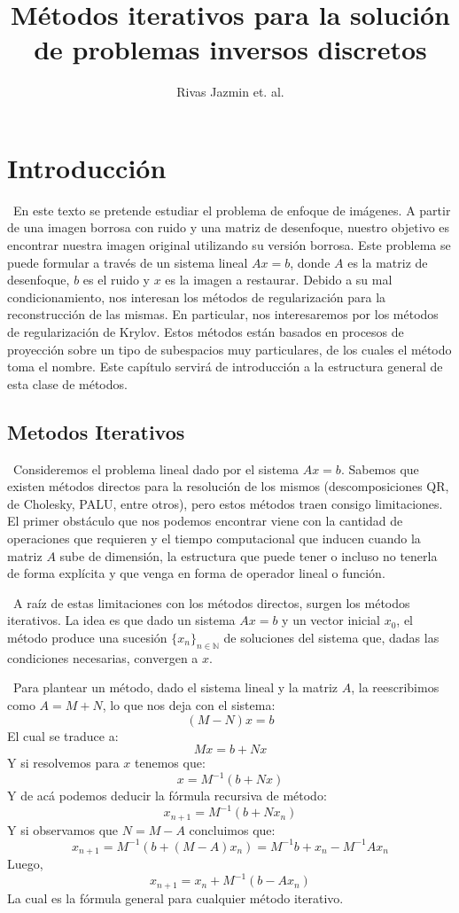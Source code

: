 \documentclass[12pt, oneside]{book}
\title{Métodos iterativos para la solución de problemas inversos discretos}
\author{Rivas Jazmin et. al.}
\date{}
\begin{document}
	\maketitle
	\tableofcontents
	
	
	\chapter{Introducción}
	\ En este texto se pretende estudiar el problema de enfoque de imágenes. A partir de una imagen borrosa con ruido y una matriz de desenfoque, nuestro objetivo es encontrar nuestra imagen original utilizando su versión borrosa. Este problema se puede formular a través de un sistema lineal $Ax = b$, donde $A$ es la matriz de desenfoque, $b$ es el ruido y $x$ es la imagen a restaurar. Debido a su mal condicionamiento, nos interesan los métodos de regularización para la reconstrucción de las mismas. En particular, nos interesaremos por los métodos de regularización de Krylov. Estos métodos están basados en procesos de proyección sobre un tipo de subespacios muy particulares, de los cuales el método toma el nombre. Este capítulo servirá de introducción a la estructura general de esta clase de métodos.
	
	
\section{Metodos Iterativos}
\ Consideremos el problema lineal dado por el sistema $Ax = b$. Sabemos que existen métodos directos para la resolución de los mismos (descomposiciones QR, de Cholesky, PALU, entre otros), pero estos métodos traen consigo limitaciones. El primer obstáculo que nos podemos encontrar viene con la cantidad de operaciones que requieren y el tiempo computacional que inducen cuando la matriz $A$ sube de dimensión, la estructura que puede tener o incluso no tenerla de forma explícita y que venga en forma de operador lineal o función.

\ A raíz de estas limitaciones con los métodos directos, surgen los métodos iterativos. La idea es que dado un sistema $Ax = b$ y un vector inicial $x_0$, el método produce una sucesión $\{x_n\}_{n \in \mathbb{N}}$ de soluciones del sistema que, dadas las condiciones necesarias, convergen a $x$.

\ Para plantear un método, dado el sistema lineal y la matriz $A$, la reescribimos como $A=M+N$, lo que nos deja con el sistema: $$(M-N)x=b$$ El cual se traduce a: $$Mx=b+Nx$$ Y si resolvemos para $x$ tenemos que: $$x=M^{-1}(b+Nx)$$ Y de acá podemos deducir la fórmula recursiva de método: $$x_{n+1}=M^{-1}(b+Nx_{n})$$ Y si observamos que $N=M-A$ concluimos que: $$x_{n+1}=M^{-1}(b+(M-A)x_{n})=M^{-1}b+x_n-M^{-1}Ax_n$$ Luego, $$x_{n+1}=x_n+M^{-1}(b-Ax_n)$$ La cual es la fórmula general para cualquier método iterativo.
\end{document}
